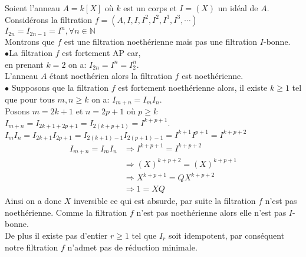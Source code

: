 \begin{monexemple}
	Soient l'anneau $A = k\left[ X\right]$ où $k$ est un corps et $I = (X)$ un idéal de $A$.\\
	Considérons la filtration $f = (A, I, I, I^2, I^2, I^3, I^3, \cdots)$\\
	$I_{2n} = I_{2n-1} = I^n, \forall n \in \mathbb{N}$\\
	Montrons que $f$ est une filtration noethérienne mais pas une filtration $I$-bonne.\\
	$\bullet$La filtration $f$ est fortement AP car, \\en prenant $k = 2$ on a: $I_{2n} = I^n = I_2^n$.\\
	L’anneau $A$ étant noethérien alors la filtration $f$ est noethérienne.\\
	$\bullet$ Supposons que la filtration $f$ est fortement noethérienne alors, il existe $k \geq 1$ tel que pour tous $m, n \geq k$ on a: $I_{m+n} = I_m I_n$.\\
	Posons $m = 2k+1$ et $n = 2p+1$ où $p \geq k$\\
	$I_{m+n} = I_{2k+1+2p+1} = I_{2(k+p+1)} = I^{k+p+1}$.\\
	$I_m I_n =  I_{2k+1}  I_{2p+1} =  I_{2(k+1)-1}  I_{2(p+1)-1} = I^{k+1} I^{p+1} = I^{k+p+2}$
	\begin{align*}
		I_{m+n} = I_m I_n &\Rightarrow I^{k+p+1} = I^{k+p+2}\\
		& \Rightarrow (X)^{k+p+2} = (X)^{k+p+1}\\
		&\Rightarrow X^{k+p+1} = QX^{k+p+2}\\
		&\Rightarrow 1 = XQ
	\end{align*}
	Ainsi on a donc $X$ inversible ce qui est absurde, par suite la filtration $f$ n'est pas noethérienne. Comme la filtration $f$ n'est pas noethérienne alors elle n'est pas $I$-bonne.\\ De plus il existe pas d'entier $r \geq 1$ tel que $I_r$ soit idempotent, par conséquent notre filtration $f$ n'admet pas de réduction minimale.
\end{monexemple}


